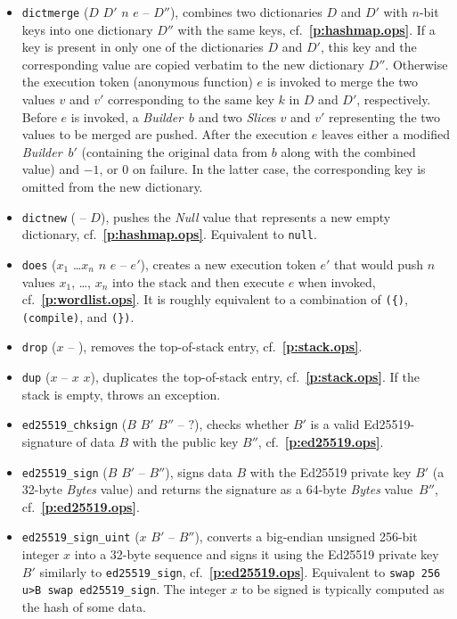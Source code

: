 \documentclass[12pt,oneside]{article}
\def\refpoint#1{{\rm\textbf{\ref{#1}}}}
\let\ptref=\refpoint
\begin{document}
\begin{itemize}
\item {\tt dictmerge} ($D$ $D'$ $n$ $e$ -- $D''$), combines two dictionaries $D$ and $D'$ with $n$-bit keys into one dictionary $D''$ with the same keys, cf.~\ptref{p:hashmap.ops}. If a key is present in only one of the dictionaries $D$ and $D'$, this key and the corresponding value are copied verbatim to the new dictionary $D''$. Otherwise the execution token (anonymous function) $e$ is invoked to merge the two values $v$ and $v'$ corresponding to the same key $k$ in $D$ and $D'$, respectively. Before $e$ is invoked, a {\em Builder\/}~$b$ and two {\em Slice\/}s $v$ and $v'$ representing the two values to be merged are pushed. After the execution $e$ leaves either a modified {\em Builder\/}~$b'$ (containing the original data from $b$ along with the combined value) and $-1$, or $0$ on failure. In the latter case, the corresponding key is omitted from the new dictionary.
\item {\tt dictnew} ( -- $D$), pushes the {\em Null\/} value that represents a new empty dictionary, cf.~\ptref{p:hashmap.ops}. Equivalent to {\tt null}.
\item {\tt does} ($x_1$ \dots $x_n$ $n$ $e$ -- $e'$), creates a new execution token $e'$ that would push $n$ values $x_1$, \dots, $x_n$ into the stack and then execute $e$ when invoked, cf.~\ptref{p:wordlist.ops}. It is roughly equivalent to a combination of {\tt (\{)}, {\tt (compile)}, and {\tt (\})}.
\item {\tt drop} ($x$ -- ), removes the top-of-stack entry, cf.~\ptref{p:stack.ops}.
\item {\tt dup} ($x$ -- $x$ $x$), duplicates the top-of-stack entry, cf.~\ptref{p:stack.ops}. If the stack is empty, throws an exception.
\item {\tt ed25519\_chksign} ($B$ $B'$ $B''$ -- $?$), checks whether $B'$ is a valid Ed25519-signature of data $B$ with the public key $B''$, cf.~\ptref{p:ed25519.ops}.
\item {\tt ed25519\_sign} ($B$ $B'$ -- $B''$), signs data $B$ with the Ed25519 private key $B'$ (a 32-byte {\em Bytes\/} value) and returns the signature as a 64-byte {\em Bytes\/} value~$B''$, cf.~\ptref{p:ed25519.ops}.
\item {\tt ed25519\_sign\_uint} ($x$ $B'$ -- $B''$), converts a big-endian unsigned 256-bit integer $x$ into a 32-byte sequence and signs it using the Ed25519 private key $B'$ similarly to {\tt ed25519\_sign}, cf.~\ptref{p:ed25519.ops}. Equivalent to {\tt swap 256 u>B swap ed25519\_sign}. The integer $x$ to be signed is typically computed as the hash of some data.

\end{itemize}
\end{document}
